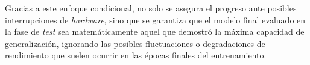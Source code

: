 Gracias a este enfoque condicional, no solo se asegura el progreso ante posibles interrupciones de \textit{hardware}, sino que se garantiza que el modelo final evaluado en la fase de \textit{test} sea matemáticamente aquel que demostró la máxima capacidad de generalización, ignorando las posibles fluctuaciones o degradaciones de rendimiento que suelen ocurrir en las épocas finales del entrenamiento.